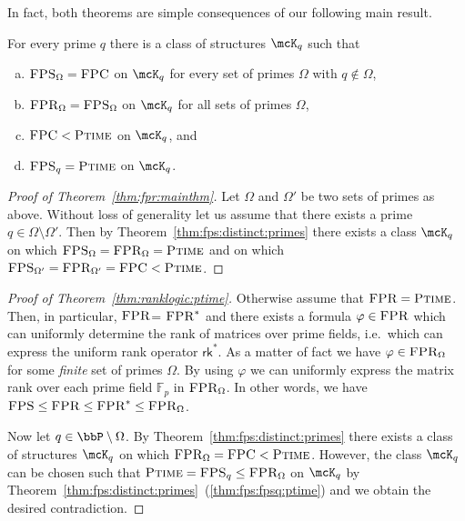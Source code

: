 \documentclass[a4paper,UKenglish]{lipics}
\newcommand{\Primes}{\bbP}
\newcommand{\field}[1]{\mathbb{#1}}
\newcommand{\logic}[1]{\ensuremath{\textsc{#1}}\xspace}
\newcommand{\FPC}{\logic{FPC}}
\newcommand{\FPRK}{\logic{FPR}}
\newcommand{\FPR}{\FPRK}
\newcommand{\FPS}{\ensuremath{\logic{FPS}}\xspace}
\newcommand{\FPSx}[1]{\ensuremath{\logic{FPS}_{#1}}\xspace}
\newcommand{\FPRvar}{\ensuremath{\logic{FPR}^*}\xspace}
\newcommand{\FPRx}[1]{\ensuremath{\logic{FPR}_{#1}}\xspace}
\newcommand{\rk}{\ensuremath{\textsf{rk}^*}\xspace}
\newcommand{\compclass}[1]{\ensuremath{\textsc{#1}}\xspace}
\newcommand{\PTIME}{\compclass{Ptime}}
\renewcommand{\phi}{\varphi}
\theoremstyle{plain}
\begin{document}
\noindent
In fact, both theorems are simple consequences of our following main result.
\begin{theorem}\label{thm:fps:distinct:primes}
For every prime $q$ there is a class of structures $\mcK_q$ such that
\begin{enumerate}[(a)]
  \item $\FPSx{\Omega} = \FPC$ on $\mcK_q$ for every set of primes $\Omega$ 
with $q \nin \Omega$, 
\label{thm:fps:distinct:primes:fps:fpc}
 \item $\FPRx{\Omega} = \FPSx{\Omega}$ on $\mcK_q$ for all sets of primes 
$\Omega$, 
 \label{thm:fps:distinct:primes:fpr:fps}
 \item $\FPC < \PTIME$ on $\mcK_q$, and
 \label{thm:fps:distinct:primes:fpc:not:ptime}
  \item $\FPSx{q}=\PTIME$ on $\mcK_q$.
 \label{thm:fps:fpsq:ptime}
\end{enumerate} 
\end{theorem}

\begin{proof}[Proof of Theorem~\ref{thm:fpr:mainthm}]
 Let $\Omega$ and $\Omega'$ be two sets of primes as above. Without loss of 
generality let us assume that there exists a prime $q \in \Omega \setminus 
\Omega'$. Then by Theorem~\ref{thm:fps:distinct:primes} there exists a class 
$\mcK_q$ on which $\FPSx{\Omega} = \FPRx{\Omega} = \PTIME$ and on which
$\FPSx{\Omega'} = \FPRx{\Omega'} = \FPC < \PTIME$.
\end{proof}

\begin{proof}[Proof of Theorem~\ref{thm:ranklogic:ptime}]
 Otherwise assume that $\FPR = \PTIME$. 
Then, in particular, \FPR = \FPRvar and there exists a formula $\phi \in 
\FPR$ which can uniformly determine the rank of matrices over prime fields, 
i.e.\ which can express the uniform rank operator $\rk$.
As a matter of fact we have $\phi \in \FPRx{\Omega}$ for some \emph{finite} set 
of primes $\Omega$.
By using $\phi$ we can uniformly express the matrix rank over each prime field 
$\field F_p$ in $\FPRx{\Omega}$. In other words, we have $\FPS \leq \FPR \leq 
\FPRvar \leq \FPRx{\Omega}$.

Now let $q \in \Primes \setminus \Omega$. 
By Theorem~\ref{thm:fps:distinct:primes} there exists a class of 
structures $\mcK_q$ on which $\FPRx{\Omega} = \FPC < \PTIME$.
However, the class $\mcK_q$ can be chosen such that $\PTIME = 
\FPSx q \leq \FPRx{\Omega}$ on $\mcK_q$ by
Theorem~\ref{thm:fps:distinct:primes}~(\ref{thm:fps:fpsq:ptime})
and we obtain the desired contradiction.
\end{proof}
\end{document}
